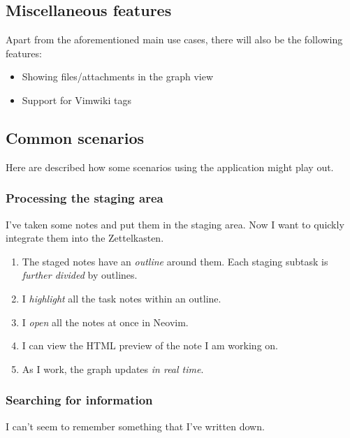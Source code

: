 \documentclass{article}
\begin{document}
\subsection{Miscellaneous features}

Apart from the aforementioned main use cases, there will also be the following features:

\begin{itemize}
	\item Showing files/attachments in the graph view

	\item Support for Vimwiki tags
\end{itemize}

\subsection{Common scenarios}

Here are described how some scenarios using the application might play out.

\subsubsection{Processing the staging area}

I've taken some notes and put them in the staging area. Now I want to quickly integrate them into the Zettelkasten.

\begin{enumerate}
	\item The staged notes have an \emph{outline} around them. Each staging subtask is \emph{further divided} by outlines.

	\item I \emph{highlight} all the task notes within an outline.

	\item I \emph{open} all the notes at once in Neovim.

	\item I can view the HTML preview of the note I am working on.

	\item As I work, the graph updates \emph{in real time}.
\end{enumerate}

\subsubsection{Searching for information}

I can't seem to remember something that I've written down.
\end{document}
